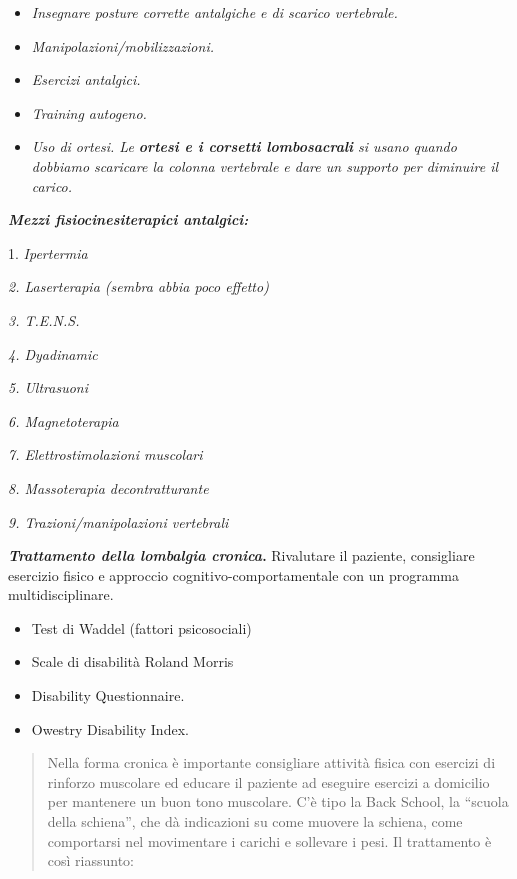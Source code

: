 \documentclass[]{article}
\begin{document}
\begin{itemize}
\item
  \emph{Insegnare posture corrette antalgiche e di scarico vertebrale. }
\item
  \emph{Manipolazioni/mobilizzazioni. }
\item
  \emph{Esercizi antalgici. }
\item
  \emph{Training autogeno.}
\item
  \emph{Uso di ortesi. Le \textbf{ortesi e i corsetti lombosacrali} si
  usano quando dobbiamo scaricare la colonna vertebrale e dare un
  supporto per diminuire il carico. }
\end{itemize}

\textbf{\emph{Mezzi fisiocinesiterapici antalgici: }}

1. \emph{Ipertermia}

\emph{2. Laserterapia (sembra abbia poco effetto) }

\emph{3. T.E.N.S.}

\emph{4. Dyadinamic}

\emph{5. Ultrasuoni}

\emph{6. Magnetoterapia}

\emph{7. Elettrostimolazioni muscolari}

\emph{8. Massoterapia decontratturante }

\emph{9. Trazioni/manipolazioni vertebrali }

\textbf{\emph{Trattamento della lombalgia cronica}.} Rivalutare il
paziente, consigliare esercizio fisico e approccio
cognitivo-comportamentale con un programma multidisciplinare.

\begin{itemize}
\item
  Test di Waddel (fattori psicosociali)
\item
  Scale di disabilità Roland Morris
\item
  Disability Questionnaire.
\item
  Owestry Disability Index.
\end{itemize}

\begin{quote}
Nella forma cronica è importante consigliare attività fisica con
esercizi di rinforzo muscolare ed educare il paziente ad eseguire
esercizi a domicilio per mantenere un buon tono muscolare. C'è tipo la
Back School, la ``scuola della schiena'', che dà indicazioni su come
muovere la schiena, come comportarsi nel movimentare i carichi e
sollevare i pesi. Il trattamento è così riassunto:
\end{quote}
\end{document}
